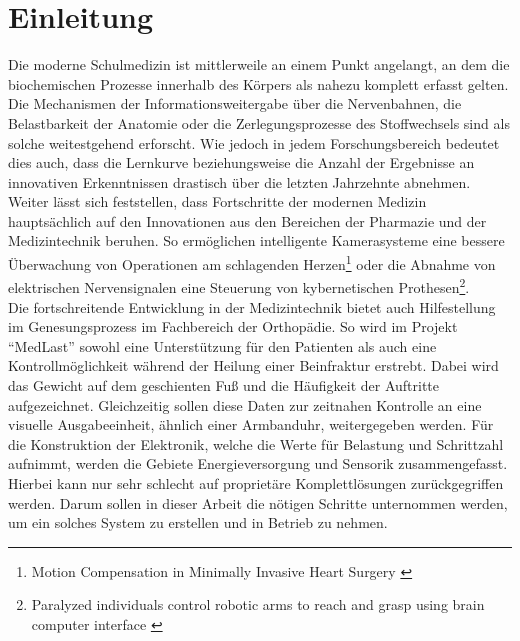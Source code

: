\documentclass[12pt]{scrreprt} %
\begin{document}
\tableofcontents
\listoffigures
\lstlistoflistings
\listoftables
\lstset{language =C}
\chapter{Einleitung}
Die moderne Schulmedizin ist mittlerweile an einem Punkt angelangt, an dem die biochemischen Prozesse innerhalb des Körpers als nahezu komplett erfasst gelten. Die Mechanismen der Informationsweitergabe über die Nervenbahnen, die Belastbarkeit der Anatomie oder die Zerlegungsprozesse des Stoffwechsels sind als solche weitestgehend erforscht. Wie jedoch in jedem Forschungsbereich bedeutet dies auch, dass die Lernkurve beziehungsweise die Anzahl der Ergebnisse an innovativen Erkenntnissen drastisch über die letzten Jahrzehnte abnehmen. Weiter lässt sich feststellen, dass Fortschritte der modernen Medizin hauptsächlich auf den Innovationen aus den Bereichen der Pharmazie und der Medizintechnik beruhen. So ermöglichen intelligente Kamerasysteme eine bessere Überwachung von Operationen am schlagenden Herzen\footnote{Motion Compensation in Minimally Invasive Heart Surgery \citep{DLR}} oder die Abnahme von elektrischen Nervensignalen eine Steuerung von kybernetischen Prothesen\footnote{Paralyzed individuals control robotic arms to reach and grasp using brain computer interface \citep{DLR2}}.\\
Die fortschreitende Entwicklung in der Medizintechnik bietet auch Hilfestellung im Genesungsprozess im Fachbereich der Orthopädie. So wird im Projekt "`MedLast"' sowohl eine Unterstützung für den Patienten als auch eine Kontrollmöglichkeit während der Heilung einer Beinfraktur erstrebt. Dabei wird das Gewicht auf dem geschienten Fuß und die Häufigkeit der Auftritte aufgezeichnet. Gleichzeitig sollen diese Daten zur zeitnahen Kontrolle an eine visuelle Ausgabeeinheit, ähnlich einer Armbanduhr, weitergegeben werden. Für die Konstruktion der Elektronik, welche die Werte für Belastung und Schrittzahl aufnimmt, werden die Gebiete Energieversorgung und Sensorik zusammengefasst. Hierbei kann nur sehr schlecht auf proprietäre Komplettlösungen zurückgegriffen werden. Darum sollen in dieser Arbeit die nötigen Schritte unternommen werden, um ein solches System zu erstellen und in Betrieb zu nehmen.
\end{document}
